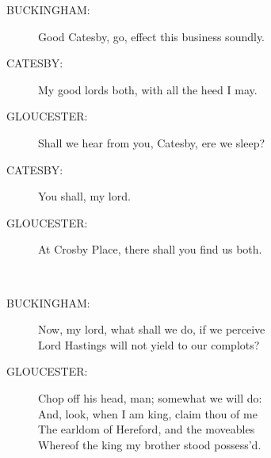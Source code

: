 \documentclass{article}
\begin{document}
\begin{description}
\item[BUCKINGHAM:] 
\hspace{1pt}Good Catesby, go, effect this business soundly.\\
\end{description}
\begin{description}
\item[CATESBY:] 
\hspace{1pt}My good lords both, with all the heed I may.\\
\end{description}
\begin{description}
\item[GLOUCESTER:] 
\hspace{1pt}Shall we hear from you, Catesby, ere we sleep?\\
\end{description}
\begin{description}
\item[CATESBY:] 
\hspace{1pt}You shall, my lord.\\
\end{description}
\begin{description}
\item[GLOUCESTER:] 
\hspace{1pt}At Crosby Place, there shall you find us both.\\
\end{description}
\\
\begin{description}
\item[BUCKINGHAM:] 
\hspace{1pt}Now, my lord, what shall we do, if we perceive\\
\hspace{1pt}Lord Hastings will not yield to our complots?\\
\end{description}
\begin{description}
\item[GLOUCESTER:] 
\hspace{1pt}Chop off his head, man; somewhat we will do:\\
\hspace{1pt}And, look, when I am king, claim thou of me\\
\hspace{1pt}The earldom of Hereford, and the moveables\\
\hspace{1pt}Whereof the king my brother stood possess'd.\\
\end{description}
\end{document}
